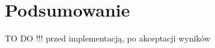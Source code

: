 \chapter{Podsumowanie}
\label{cha:podsumowanie}
TO DO !!! przed implementacją, po akceptacji wyników